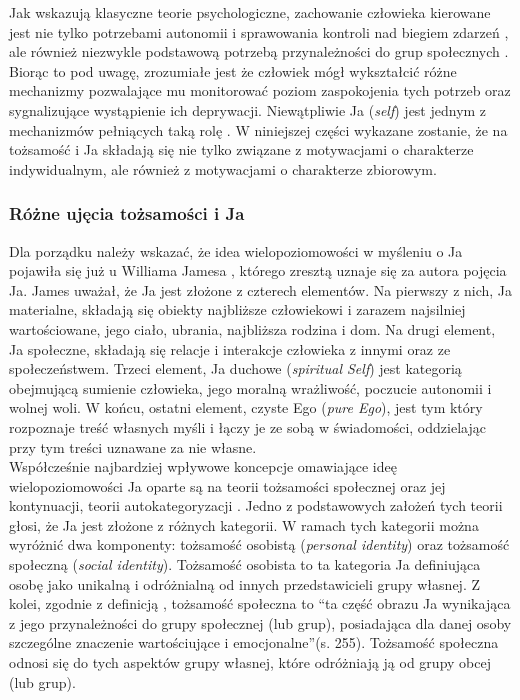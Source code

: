 \documentclass[man]{apa6}
\begin{document}
Jak wskazują klasyczne teorie psychologiczne, zachowanie człowieka kierowane jest nie tylko potrzebami autonomii i sprawowania kontroli nad biegiem zdarzeń \parencite[np.,][]{wortman1975responses, deci2000and}, ale również niezwykle podstawową potrzebą przynależności do grup społecznych \parencite{baumeister1995need}. Biorąc to pod uwagę, zrozumiałe jest że człowiek mógł wykształcić różne mechanizmy pozwalające mu monitorować poziom zaspokojenia tych potrzeb oraz sygnalizujące wystąpienie ich deprywacji. Niewątpliwie Ja (\emph{self}) jest jednym z mechanizmów pełniących taką rolę \parencite[patrz,][]{higgins1989self, higgins1996self}. W niniejszej części wykazane zostanie, że na tożsamość i Ja składają się nie tylko związane z motywacjami o charakterze indywidualnym, ale również z motywacjami o charakterze zbiorowym.\\

\subsubsection{Różne ujęcia tożsamości i Ja}

Dla porządku należy wskazać, że idea wielopoziomowości w myśleniu o Ja pojawiła się już u Williama Jamesa \parencite{james1890principles}, którego zresztą uznaje się za autora pojęcia Ja. James uważał, że Ja jest złożone z czterech elementów. Na pierwszy z nich, Ja materialne, składają się obiekty najbliższe człowiekowi i zarazem najsilniej wartościowane, jego ciało, ubrania, najbliższa rodzina i dom. Na drugi element, Ja społeczne, składają się relacje i interakcje człowieka z innymi oraz ze społeczeństwem. Trzeci element, Ja duchowe (\emph{spiritual Self}) jest kategorią obejmującą sumienie człowieka, jego moralną wrażliwość, poczucie autonomii i wolnej woli. W końcu, ostatni element, czyste Ego (\emph{pure Ego}), jest tym który rozpoznaje treść własnych myśli i łączy je ze sobą w świadomości, oddzielając przy tym treści uznawane za nie własne.\\

Współcześnie najbardziej wpływowe koncepcje omawiające ideę wielopoziomowości Ja oparte są na teorii tożsamości społecznej \parencite{tajfel1986social} oraz jej kontynuacji, teorii autokategoryzacji \parencite{turner1987rediscovering, turner1994self}. Jedno z podstawowych założeń tych teorii głosi, że Ja jest złożone z różnych kategorii. W ramach tych kategorii można wyróżnić dwa komponenty: tożsamość osobistą (\emph{personal identity}) oraz tożsamość społeczną (\emph{social identity}). Tożsamość osobista to ta kategoria Ja definiująca osobę jako unikalną i odróżnialną od innych przedstawicieli grupy własnej. Z kolei, zgodnie z definicją \textcite{tajfel1981human}, tożsamość społeczna to ``ta część obrazu Ja wynikająca z jego przynależności do grupy społecznej (lub grup), posiadająca dla danej osoby szczególne znaczenie wartościujące i emocjonalne''(s. 255). Tożsamość społeczna odnosi się do tych aspektów grupy własnej, które odróżniają ją od grupy obcej (lub grup).\\
\end{document}
